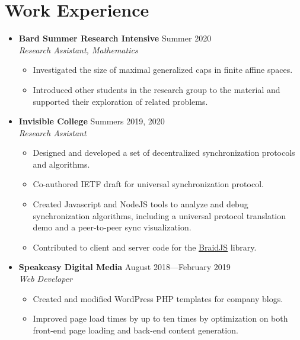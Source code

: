 \documentclass[12pt,letterpaper]{article}
\newenvironment{explist}
{\begin{itemize}[label=\textbf{--},itemsep=1pt,topsep=0pt,partopsep=0pt,parsep=0pt]}
{\end{itemize}}
\begin{document}
\section*{Work Experience} \vspace{-0.5em}
\begin{itemize}[label=,itemsep=0pt]
    \item
    \textbf{Bard Summer Research Intensive} \hfill Summer 2020\\
    \textit{Research Assistant, Mathematics}
    \begin{explist}
        \item Investigated the size of maximal generalized caps in finite affine spaces.
        \item Introduced other students in the research group to the material and supported their exploration of related problems.
    \end{explist}
	\item 
	\textbf{Invisible College} \hfill Summers 2019, 2020\\
	\textit{Research Assistant}
	\begin{explist}
		\item Designed and developed a set of decentralized synchronization protocols and algorithms.
		\item Co-authored IETF draft for universal synchronization protocol.
		\item Created Javascript and NodeJS tools to analyze and debug synchronization algorithms, including a universal protocol translation demo and a peer-to-peer sync visualization.
        \item Contributed to client and server code for the \underline{\href{https://github.com/braid-work/braidjs}{BraidJS}} library.
	\end{explist}

	\item
	\textbf{Speakeasy Digital Media} \hfill August 2018---February 2019\\
	\textit{Web Developer}
	\begin{explist}
		\item Created and modified WordPress PHP templates for company blogs.
		\item Improved page load times by up to ten times by optimization on both front-end page loading and back-end content generation.
	\end{explist}
	

\end{itemize}
\end{document}

